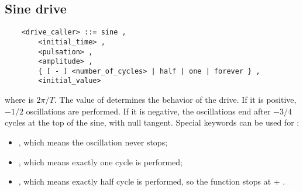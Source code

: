 \subsection{Sine drive}
\begin{verbatim}
    <drive_caller> ::= sine ,
        <initial_time> ,
        <pulsation> ,
        <amplitude> ,
        { [ - ] <number_of_cycles> | half | one | forever } , 
        <initial_value>
\end{verbatim}
where  is $2\pi/T$.
The value of  determines the behavior of the drive. 
If it is positive, $-1/2$ oscillations are performed. 
If it is negative, the oscillations end after 
$-3/4$ cycles at the top of the sine, with null
tangent.
Special keywords can be used for :
\begin{itemize}
	\item {}, which means the oscillation never stops;
	\item {}, which means exactly one cycle is performed;
	\item {}, which means exactly half cycle is performed,
	so the function stops at  + .
\end{itemize}

